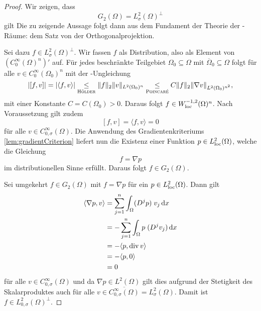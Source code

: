 \begin{proof}
  Wir zeigen, dass 
  $$
  G_2(\Omega) = L_\sigma^2(\Omega)^\perp
  $$
  gilt
  Die zu zeigende Aussage folgt dann aus dem Fundament der Theorie der \hilbert\hyp{}Räume: dem Satz von der Orthogonalprojektion.

  Sei dazu $f \in L_\sigma^2(\Omega)^\perp$.
  Wir fassen $f$ als Distribution, also als Element von $(C_0^\infty(\Omega)^n)'$ auf.
  Für jedes beschränkte Teilgebiet $\Omega_0 \subseteq \Omega$ mit $\overline\Omega_0 \subseteq \Omega$ folgt für alle $v \in C_0^\infty(\Omega_0)^n$ mit der \poincare\hyp{}Ungleichung
  $$
  |[f, v]| 
  = |\langle f, v \rangle| 
  \underset{\hoelder}{\leq}  \norm{f}_2 \norm{v}_{L^2(\Omega_0)^n}
  \underset{\poincare}{\leq} C \norm{f}_2 \norm{\nabla v}_{L^2(\Omega_0)^{n^2}},
  $$
  mit einer Konstante $C = C(\Omega_0) > 0$.
  Daraus folgt $f \in W_{\loc}^{-1,2}(\Omega)^n$.
  Nach Voraussetzung gilt zudem 
  $$
  [f,v] = \langle f, v \rangle = 0
  $$
  für alle $v \in C_{0, \sigma}^\infty(\Omega)$.
  Die Anwendung des Gradientenkriteriums \ref{lem:gradientCriterion} liefert nun die Existenz einer Funktion $p \in L_{\loc}^2(\Omega)$, welche die Gleichung
  $$
  f = \nabla p
  $$
  im distributionellen Sinne erfüllt.
  Daraus folgt $f \in G_2(\Omega)$.

  Sei umgekehrt $f \in G_2(\Omega)$ mit $f = \nabla p$ für ein $p \in L^2_{\loc}(\Omega)$.
  Dann gilt
  \begin{align*}
  \langle \nabla p, v \rangle
  &= \sum_{j = 1}^n \int_\Omega (D^j p)\;v_j \d x \\
  &= - \sum_{j = 1}^n \int_\Omega p\;(D^j v_j) \d x \\
  &= - \langle p, \div v \rangle  \\
  &= - \langle p, 0 \rangle  \\
  &= 0
  \end{align*}
  für alle $v \in C_{0, \sigma}^\infty(\Omega)$ und da $\nabla p \in L^2(\Omega)$ gilt dies aufgrund der Stetigkeit des Skalarproduktes auch für alle $v \in \overline{C_{0, \sigma}^\infty(\Omega)} = L_\sigma^2(\Omega)$.
  Damit ist $f \in L_{0,\sigma}^2(\Omega)^\perp$.
  
\end{proof}
